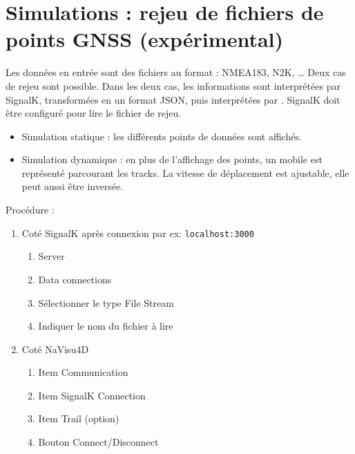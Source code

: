 \section{Simulations : rejeu de fichiers de points GNSS (expérimental)}
Les données en entrée sont des fichiers au format : NMEA183, N2K, \ldots
Deux cas de rejeu sont possible.
Dans les deux cas, les informations sont interprétées par SignalK, transformées en un format JSON,  puis interprétées par \nav. SignalK doit être configuré pour lire le fichier de rejeu.
\begin{itemize}
\item Simulation statique : les différents points de données sont affichés.
\item Simulation dynamique : en plus de l'affichage des points, un mobile est représenté parcourant les tracks. La vitesse de déplacement est ajustable, elle peut aussi être inversée.
\end{itemize}
Procédure : 
\begin{enumerate}
\item Coté SignalK après connexion par ex: {\tt localhost:3000}
\begin{enumerate}
\item Server
\item Data connections
\item Sélectionner le type File Stream
\item Indiquer le nom du fichier à lire
\end{enumerate}
\item Coté NaVisu4D
\begin{enumerate}
\item Item Communication
\item Item SignalK Connection
\item Item Trail (option)
\item Bouton Connect/Disconnect
\end{enumerate}
\end{enumerate}


